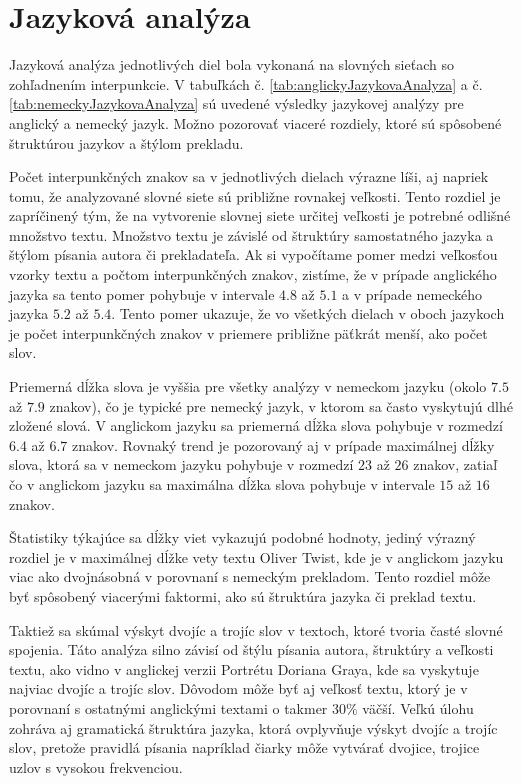\clearpage

\section{Jazyková analýza}\label{sec:jazykovaAnalyza}

Jazyková analýza jednotlivých diel bola vykonaná na slovných sieťach so zohľadnením interpunkcie.
V tabuľkách č. \ref{tab:anglickyJazykovaAnalyza} a č. \ref{tab:nemeckyJazykovaAnalyza} sú uvedené výsledky jazykovej analýzy pre anglický a nemecký jazyk.
Možno pozorovať viaceré rozdiely, ktoré sú spôsobené štruktúrou jazykov a štýlom prekladu.

Počet interpunkčných znakov sa v jednotlivých dielach výrazne líši, aj napriek tomu, že analyzované slovné siete sú približne rovnakej veľkosti.
Tento rozdiel je zapríčinený tým, že na vytvorenie slovnej siete určitej veľkosti je potrebné odlišné množstvo textu. Množstvo textu je závislé od
štruktúry samostatného jazyka a štýlom písania autora či prekladateľa. Ak si vypočítame pomer medzi veľkosťou vzorky textu a počtom interpunkčných znakov,
zistíme, že v prípade anglického jazyka sa tento pomer pohybuje v intervale $4.8$ až $5.1$ a v prípade nemeckého jazyka $5.2$ až $5.4$.
Tento pomer ukazuje, že vo všetkých dielach v oboch jazykoch je počet interpunkčných znakov v priemere približne päťkrát menší, ako počet slov.

Priemerná dĺžka slova je vyššia pre všetky analýzy v nemeckom jazyku (okolo $7.5$ až $7.9$ znakov), čo je typické pre nemecký jazyk, v ktorom sa
často vyskytujú dlhé zložené slová. V anglickom jazyku sa priemerná dĺžka slova pohybuje v rozmedzí $6.4$ až $6.7$ znakov. Rovnaký 
trend je pozorovaný aj v prípade maximálnej dĺžky slova, ktorá sa v nemeckom jazyku pohybuje v rozmedzí $23$ až $26$ znakov, zatiaľ čo v anglickom jazyku
sa maximálna dĺžka slova pohybuje v intervale $15$ až $16$ znakov.

Štatistiky týkajúce sa dĺžky viet vykazujú podobné hodnoty, jediný výrazný rozdiel je v maximálnej dĺžke vety textu Oliver Twist, kde je v anglickom jazyku
viac ako dvojnásobná v porovnaní s nemeckým prekladom. Tento rozdiel môže byť spôsobený viacerými faktormi, ako sú štruktúra jazyka či preklad textu.	

Taktiež sa skúmal výskyt dvojíc a trojíc slov v textoch, ktoré tvoria časté slovné spojenia. Táto analýza silno závisí od štýlu písania autora, štruktúry a veľkosti textu, ako
vidno v anglickej verzii Portrétu Doriana Graya, kde sa vyskytuje najviac dvojíc a trojíc slov. Dôvodom môže byť aj veľkosť textu, ktorý je v porovnaní s ostatnými anglickými textami
o takmer $30\%$ väčší. Veľkú úlohu zohráva aj gramatická štruktúra jazyka, ktorá ovplyvňuje výskyt dvojíc a trojíc slov, pretože pravidlá písania napríklad čiarky môže vytvárať
dvojice, trojice uzlov s vysokou frekvenciou.

